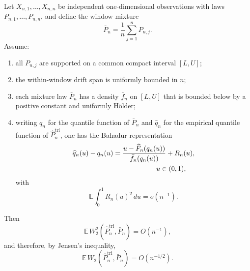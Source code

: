 \begin{proposition}\label{prop:one_dimensional_root_n_bound}
Let $X_{n,1},\dots,X_{n,n}$ be independent one-dimensional observations with laws
$P_{n,1},\dots,P_{n,n}$, and define the window mixture
\[
  \bar P_n = \frac{1}{n}\sum_{j=1}^n P_{n,j}.
\]
Assume:
\begin{enumerate}[label=(\roman*)]
  \item all $P_{n,j}$ are supported on a common compact interval $[L,U]$;
  \item the within-window drift span is uniformly bounded in $n$;
  \item each mixture law $\bar P_n$ has a density $\bar f_n$ on $[L,U]$ that is
  bounded below by a positive constant and uniformly Hölder;
  \item writing $q_n$ for the quantile function of $\bar P_n$ and $\widehat q_n$
  for the empirical quantile function of $\widehat P_n^{\mathrm{tri}}$, one has
  the Bahadur representation
  \[
    \begin{aligned}
    \widehat q_n(u)-q_n(u)
    &= \frac{u-\widehat F_n(q_n(u))}{\bar f_n(q_n(u))} + R_n(u), \\
    &\hspace{2.2cm} u\in(0,1),
    \end{aligned}
  \]
  with
  \[
    \mathbb E\int_0^1 R_n(u)^2\,du=o(n^{-1}).
  \]
\end{enumerate}
Then
\[
  \mathbb E\,W_2^2\!\left(\widehat P_n^{\mathrm{tri}},\bar P_n\right)=O(n^{-1}),
\]
and therefore, by Jensen's inequality,
\[
  \mathbb E\,W_2\!\left(\widehat P_n^{\mathrm{tri}},\bar P_n\right)=O(n^{-1/2}).
\]
\end{proposition}

